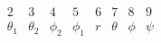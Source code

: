 \begin{equation}
   \begin{array}{cccccccc}
    2& 3 & 4 & 5 & 6 & 7 & 8 & 9  \\
     \theta _1 & \theta _2 & \phi _2 & \phi _1 & r & \theta  & \phi  &
     \psi
  \end{array}
 \label{variables}
\end{equation}

